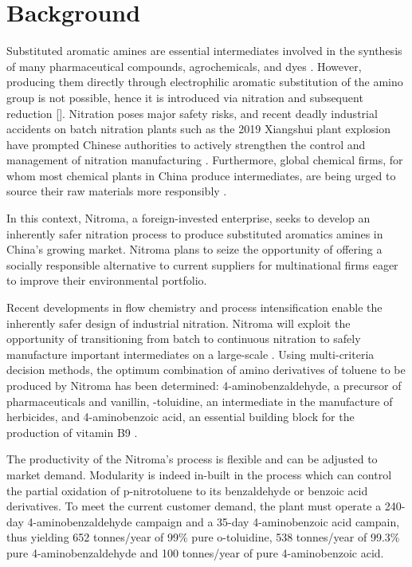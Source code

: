 \section*{Background}

Substituted aromatic amines are essential intermediates involved in the synthesis of many pharmaceutical compounds, agrochemicals, and dyes \cite{vogt_amines_2000}. However, producing them directly through electrophilic aromatic substitution of the amino group is not possible, hence it is introduced via nitration and subsequent reduction []. Nitration poses major safety risks, and recent deadly industrial accidents on batch nitration plants such as the 2019 Xiangshui plant explosion have prompted Chinese authorities to actively strengthen the control and management of nitration manufacturing \cite{el_diario_china_2019}. Furthermore, global chemical firms, for whom most chemical plants in China produce intermediates, are being urged to source their raw materials more responsibly \cite{stanway_global_2019}.

In this context, Nitroma, a foreign-invested enterprise, seeks to develop an inherently safer nitration process to produce substituted aromatics amines in China's growing market. Nitroma plans to seize the opportunity of offering a socially responsible alternative to current suppliers for multinational firms eager to improve their environmental portfolio. 

Recent developments in flow chemistry and process intensification enable the inherently safer design of industrial nitration. Nitroma will exploit the opportunity of transitioning from batch to continuous nitration to safely manufacture important intermediates on a large-scale \cite{di_miceli_raimondi_safety_2015}. Using multi-criteria decision methods, the optimum combination of amino derivatives of toluene to be produced by Nitroma has been determined: 4-aminobenzaldehyde, a precursor of pharmaceuticals and vanillin, \ortho-toluidine, an intermediate in the manufacture of herbicides, and 4-aminobenzoic acid, an essential building block for the production of vitamin B9 \cite{bowers_toluidines_2000,bruhne_benzaldehyde_2011,maki_benzoic_2000}.

The productivity of the Nitroma's process is flexible and can be adjusted to market demand. Modularity is indeed in-built in the process which can control the partial oxidation of p-nitrotoluene to its benzaldehyde or benzoic acid derivatives. To meet the current customer demand, the plant must operate a 240-day 4-aminobenzaldehyde campaign and a 35-day 4-aminobenzoic acid campain, thus yielding 652 tonnes/year of 99\% pure o-toluidine, 538 tonnes/year of 99.3\% pure 4-aminobenzaldehyde and 100 tonnes/year of pure 4-aminobenzoic acid.

